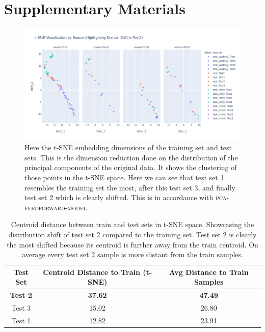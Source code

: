\documentclass[conference]{IEEEtran}
\begin{document}
\section*{Supplementary Materials}
\begin{figure}
    \centering
    \includegraphics[scale=.5]{figures/supplementary_distribution shift test set 2.png}
    \caption{Here the t-SNE  embedding dimensions of the training set and test sets. This is the dimension reduction done on the distribution of the principal components of the original data. It shows the clustering of those points in the t-SNE space. Here we can see that test set 1 resembles the training set the most, after this test set 3, and finally test set 2 which is clearly shifted. This is in accordance with \textsc{pca-feedforward-model}}
    \label{fig:tsne_distribution_shift}
\end{figure}

\begin{table}
    \centering
    \begin{tabular}{|c|c|c|}
        \hline
        Test Set & Centroid Distance to Train (t-SNE) & Avg Distance to Train Samples \\
        \hline
        \textbf{Test 2} & \textbf{37.62} & \textbf{47.49} \\
        Test 3 & 15.02 & 26.80 \\
        Test 1 & 12.82 & 23.91 \\
        \hline
    \end{tabular}
    \caption{Centroid distance between train and test sets in t-SNE space. Showcasing the distribution shift of test set 2 compared to the training set. Test set 2 is clearly the most shifted because its centroid is further away from the train centroid. On average every test set 2 sample is more distant from the train samples.}
    \label{tab:centroid_distance}
\end{table}
\end{document}
